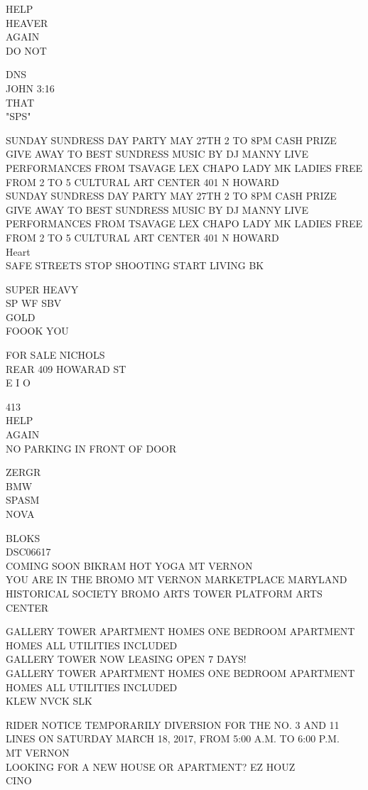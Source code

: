 \documentclass[10pt,letterpaper]{article}
\begin{document}
HELP\\
HEAVER\\
AGAIN\\
DO NOT

DNS\\
JOHN 3:16\\
THAT\\
"SPS"

SUNDAY SUNDRESS DAY PARTY MAY 27TH 2 TO 8PM CASH PRIZE GIVE AWAY TO BEST SUNDRESS MUSIC BY DJ MANNY LIVE PERFORMANCES FROM TSAVAGE LEX CHAPO LADY MK LADIES FREE FROM 2 TO 5 CULTURAL ART CENTER 401 N HOWARD\\
SUNDAY SUNDRESS DAY PARTY MAY 27TH 2 TO 8PM CASH PRIZE GIVE AWAY TO BEST SUNDRESS MUSIC BY DJ MANNY LIVE PERFORMANCES FROM TSAVAGE LEX CHAPO LADY MK LADIES FREE FROM 2 TO 5 CULTURAL ART CENTER 401 N HOWARD\\
Heart\\
SAFE STREETS STOP SHOOTING START LIVING BK

SUPER HEAVY\\
SP WF SBV\\
GOLD\\
FOOOK YOU

FOR SALE NICHOLS\\
REAR 409 HOWARAD ST\\
E I O

413\\
HELP\\
AGAIN\\
NO PARKING IN FRONT OF DOOR

ZERGR\\
BMW\\
SPASM\\
NOVA

BLOKS\\
DSC06617\\
COMING SOON BIKRAM HOT YOGA MT VERNON\\
YOU ARE IN THE BROMO MT VERNON MARKETPLACE MARYLAND HISTORICAL SOCIETY BROMO ARTS TOWER PLATFORM ARTS CENTER

GALLERY TOWER APARTMENT HOMES ONE BEDROOM APARTMENT HOMES ALL UTILITIES INCLUDED\\
GALLERY TOWER NOW LEASING OPEN 7 DAYS!\\
GALLERY TOWER APARTMENT HOMES ONE BEDROOM APARTMENT HOMES ALL UTILITIES INCLUDED\\
KLEW NVCK SLK

RIDER NOTICE TEMPORARILY DIVERSION FOR THE NO. 3 AND 11 LINES ON SATURDAY MARCH 18, 2017, FROM 5:00 A.M. TO 6:00 P.M.\\
MT VERNON\\
LOOKING FOR A NEW HOUSE OR APARTMENT?  EZ HOUZ\\
CINO
\end{document}
